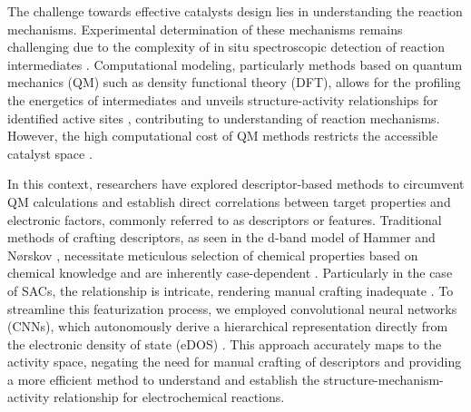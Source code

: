 The challenge towards effective catalysts design lies in understanding the reaction mechanisms.
Experimental determination of these mechanisms remains challenging due to
the complexity of in situ spectroscopic detection of reaction intermediates \cite{zhao2021revisiting}.
Computational modeling, particularly methods based on quantum mechanics (QM) such as density functional theory (DFT),
allows for the profiling the energetics of intermediates and unveils structure-activity relationships
for identified active sites \cite{feaster2017understanding, carter2008challenges},
contributing to understanding of reaction mechanisms.
However, the high computational cost of QM methods restricts the
accessible catalyst space \cite{jinnouchi2017predicting, cuenya2015nanocatalysis, goldsmith2018machine}.

In this context, researchers have explored descriptor-based methods
to circumvent QM calculations and establish direct correlations
between target properties and electronic factors, commonly referred to as descriptors or features.
Traditional methods of crafting descriptors, as seen in the d-band model of Hammer and Nørskov \cite{hammer1995electronic},
necessitate meticulous selection of chemical properties based on chemical knowledge
and are inherently case-dependent \cite{kajita2017universal}.
Particularly in the case of SACs, the relationship is intricate,
rendering manual crafting inadequate \cite{han2021single, thirumalai2018investigating}.
To streamline this featurization process, we employed convolutional neural networks (CNNs),
which autonomously derive a hierarchical representation directly from the electronic density of state (eDOS)
\cite{tran2015learning, socher2012convolutional, krizhevsky2012imagenet}.
This approach accurately maps to the activity space, negating the need for manual crafting of descriptors
and providing a more efficient method to understand and
establish the structure-mechanism-activity relationship for electrochemical reactions.

